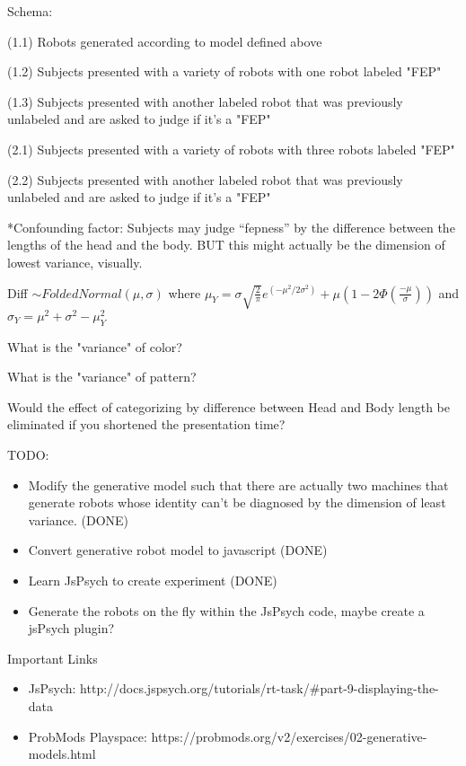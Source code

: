 \documentclass[12pt]{article}
\begin{document}
\noindent Schema: 

\noindent (1.1) Robots generated according to model defined above

\noindent (1.2) Subjects presented with a variety of robots with one robot labeled "FEP"

\noindent (1.3) Subjects presented with another labeled robot that was previously unlabeled and are asked to judge if it's a "FEP"

\noindent (2.1) Subjects presented with a variety of robots with three robots labeled "FEP"

\noindent (2.2) Subjects presented with another labeled robot that was previously unlabeled and are asked to judge if it's a "FEP"

\vspace{0.2in}

\noindent **Confounding factor: Subjects may judge ``fepness'' by the difference between the lengths of the head and the body. BUT this might actually be the dimension of lowest variance, visually.

\vspace{0.2in}

\noindent Diff $\sim FoldedNormal(\mu,\sigma)$ where $\mu_Y = \sigma \sqrt{\frac{2}{\pi}}e^{(-\mu^2/2\sigma^2)} + \mu (1-2\Phi(\frac{-\mu}{\sigma}))$ and $\sigma_Y = \mu^2 + \sigma^2 - \mu_Y ^2$

\noindent What is the "variance" of color?

\noindent What is the "variance" of pattern?

\noindent Would the effect of categorizing by difference between Head and Body length be eliminated if you shortened the presentation time?

\vspace{0.5in}

\noindent TODO:
\begin{itemize}
	\item Modify the generative model such that there are actually two machines that generate robots whose identity can't be diagnosed by the dimension of least variance. (DONE)
	\item Convert generative robot model to javascript (DONE)
	\item Learn JsPsych to create experiment (DONE)
	\item Generate the robots on the fly within the JsPsych code, maybe create a jsPsych plugin?
\end{itemize}

\vspace{0.5in}
\noindent Important Links
\begin{itemize}
	\item JsPsych: http://docs.jspsych.org/tutorials/rt-task/\#part-9-displaying-the-data
	\item ProbMods Playspace: https://probmods.org/v2/exercises/02-generative-models.html
\end{itemize}
\end{document}
